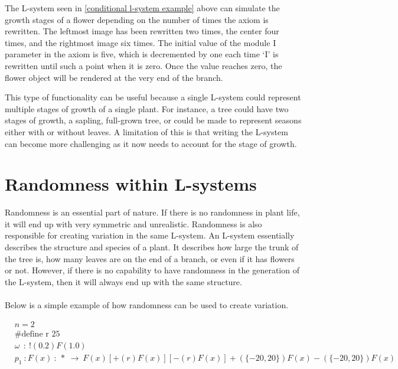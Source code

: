 \vspace{5mm}
\noindent
The L-system seen in \ref{conditional l-system example} above can simulate the growth stages of a flower depending on the number of times the axiom is rewritten. The leftmost image has been rewritten two times, the center four times, and the rightmost image six times. The initial value of the module I parameter in the axiom is five, which is decremented by one each time `I' is rewritten until such a point when it is zero. Once the value reaches zero, the flower object will be rendered at the very end of the branch. 

This type of functionality can be useful because a single L-system could represent multiple stages of growth of a single plant. For instance, a tree could have two stages of growth, a sapling, full-grown tree, or could be made to represent seasons either with or without leaves. A limitation of this is that writing the L-system can become more challenging as it now needs to account for the stage of growth. 

\section{Randomness within L-systems} \label{Randomness L-system Subsection}

Randomness is an essential part of nature. If there is no randomness in plant life, it will end up with very symmetric and unrealistic. Randomness is also responsible for creating variation in the same L-system. An L-system essentially describes the structure and species of a plant. It describes how large the trunk of the tree is, how many leaves are on the end of a branch, or even if it has flowers or not. However, if there is no capability to have randomness in the generation of the L-system, then it will always end up with the same structure.\\ 
\\
Below is a simple example of how randomness can be used to create variation.

\begin{equation} \label{randomness example}
\begin{aligned}
	&n=2\\
	&\text{\#define r 25} \\
	&\omega~~ :~ !(0.2)F(1.0)\\
	&p_1~ :  F(x)~ :~ *~ \rightarrow~ F(x)[+(r)F(x)][-(r)F(x)]+(\{-20, 20\})F(x)-(\{-20, 20\})F(x)\\
\end{aligned}
\end{equation}

